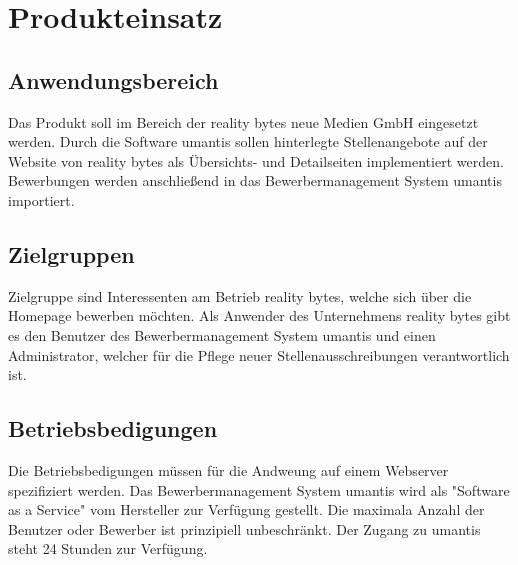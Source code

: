\section{Produkteinsatz}

    \subsection{Anwendungsbereich}

        Das Produkt soll im Bereich der reality bytes neue Medien GmbH eingesetzt werden. Durch die Software umantis sollen hinterlegte Stellenangebote auf der Website von reality bytes als Übersichts- und Detailseiten implementiert werden. Bewerbungen werden anschließend in das Bewerbermanagement System umantis importiert.

    \subsection{Zielgruppen}

        Zielgruppe sind Interessenten am Betrieb reality bytes, welche sich über die \Gls{Homepage} bewerben möchten. Als Anwender des Unternehmens reality bytes gibt es den Benutzer des Bewerbermanagement System umantis und einen Administrator, welcher für die Pflege neuer Stellenausschreibungen verantwortlich ist.

    \subsection{Betriebsbedigungen}

        Die Betriebsbedigungen müssen für die Andweung auf einem Webserver spezifiziert werden. Das Bewerbermanagement System umantis wird als "Software as a Service" vom Hersteller zur Verfügung gestellt. Die maximala Anzahl der Benutzer oder Bewerber ist prinzipiell unbeschränkt. Der Zugang zu umantis steht 24 Stunden zur Verfügung.